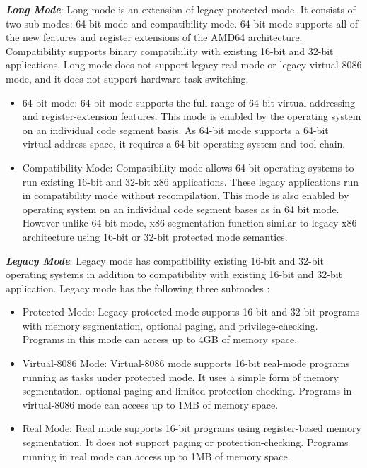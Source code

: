 


\emph {\bf Long Mode}: Long mode is an extension of legacy protected mode. It consists of two sub modes: 64-bit mode and compatibility mode. 64-bit mode supports all of the new features and register extensions of the AMD64 architecture. Compatibility supports binary compatibility with existing 16-bit and 32-bit applications. Long mode does not support legacy real mode or legacy virtual-8086 mode, and it does not support hardware task switching.
\begin{itemize}

\item 64-bit mode: 64-bit mode supports the full range of 64-bit virtual-addressing and register-extension features. This mode is enabled by the operating system on an individual code segment basis. As 64-bit mode supports a 64-bit virtual-address space, it requires a 64-bit operating system and tool chain.


\item Compatibility Mode: Compatibility mode allows 64-bit operating systems to run existing 16-bit and 32-bit x86 applications. These legacy applications run in compatibility mode without recompilation. This mode is also enabled by operating system on an individual code segment bases as in 64 bit mode. However unlike 64-bit mode, x86 segmentation function similar to legacy x86 architecture using 16-bit or 32-bit protected mode semantics.

\end{itemize}



\emph {\bf Legacy Mode}: Legacy mode has compatibility existing 16-bit and 32-bit operating systems in addition to compatibility with existing 16-bit and 32-bit application. Legacy mode has the following three submodes : 

\begin{itemize}

\item Protected Mode: Legacy protected mode supports 16-bit and 32-bit programs with memory segmentation, optional paging, and privilege-checking. Programs in this mode can access up to 4GB of memory space.


\item Virtual-8086 Mode: Virtual-8086 mode supports 16-bit real-mode programs running as tasks under protected mode. It uses a simple form of memory segmentation, optional paging and limited protection-checking. Programs in virtual-8086 mode can access up to 1MB of memory space.


\item Real Mode: Real mode supports 16-bit programs using register-based memory segmentation. It does not support paging or protection-checking. Programs running in real mode can access up to 1MB of memory space.
\end{itemize}

